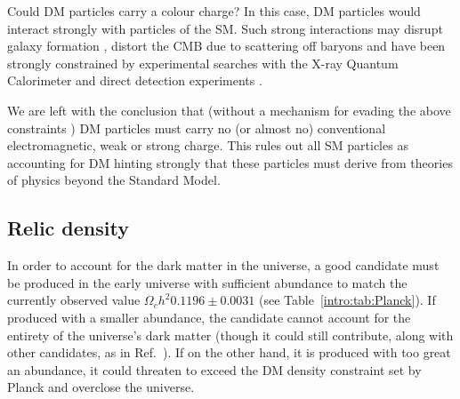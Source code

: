 Could DM particles carry a colour charge? In this case, DM particles would interact strongly with particles of the SM. Such strong interactions may disrupt galaxy formation \cite{Natarajan:2002}, distort the CMB due to scattering off baryons \cite{Chen:2002} and have been strongly constrained by experimental searches with the X-ray Quantum Calorimeter \cite{Erickcek:2007} and direct detection experiments \cite{Albuquerque:2004}. 

We are left with the conclusion that (without a mechanism for evading the above constraints \cite{AnExample}) DM particles must carry no (or almost no) conventional electromagnetic, weak or strong charge. This rules out all SM particles  as accounting for DM hinting strongly that these particles must derive from theories of physics beyond the Standard Model.

\subsection{Relic density}

In order to account for the dark matter in the universe, a good candidate must be produced in the early universe with sufficient abundance to match the currently observed value $\Omega_c h^2 0.1196 \pm 0.0031$ (see Table~\ref{intro:tab:Planck}). If produced with a smaller abundance, the candidate cannot account for the entirety of the universe's dark matter (though it could still contribute, along with other candidates, as in Ref.~\cite{Feldman:2010}). If on the other hand, it is produced with too great an abundance, it could threaten to exceed the DM density constraint set by Planck and overclose the universe.


